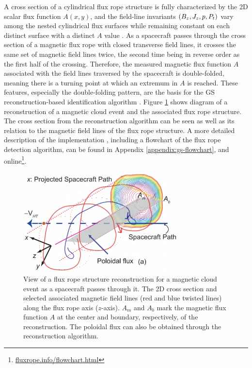 A cross section of a cylindrical flux rope structure is fully characterized by the 2D scalar flux function $A(x, y)$, and the field-line invariants $\left( B_z,J_z,p, P_t \right)$ vary among the nested cylindrical flux surfaces while remaining constant on each distinct surface with a distinct $A$ value \citep{Hu:2018}. As a spacecraft passes through the cross section of a magnetic flux rope with closed transverse field lines, it crosses the same set of magnetic field lines twice, the second time being in reverse order as the first half of the crossing. Therefore, the measured magnetic flux function $A$ associated with the field lines traversed by the spacecraft is double-folded, meaning there is a turning point at which an extremum in $A$ is reached. These features, especially the double-folding pattern, are the basis for the GS reconstruction-based identification algorithm \citep{Hu:2018}. Figure \ref{fig:GSreconstruction_Hu2017} shows diagram of a reconstruction of a magnetic cloud event and the associated flux rope structure. The cross section from the reconstruction algorithm can be seen as well as its relation to the magnetic field lines of the flux rope structure. A more detailed description of the implementation \citep{Hu:2018}, including a flowchart of the flux rope detection algorithm, can be found in Appendix \ref{appendix:gs-flowchart}, and online\footnote{\url{fluxrope.info/flowchart.html}}.

\begin{figure}
    \centering
    \includegraphics[width=0.75\textwidth]{Figures/Hu2017_5a.png}
    \caption[2D cross section view of a flux rope structure reconstruction] {View of a flux rope structure reconstruction for a magnetic cloud event \citep{Hu:2015} as a spacecraft passes through it. The 2D cross section and selected associated magnetic field lines (red and blue twisted lines) along the flux rope axis ($z$-axis). $A_m$ and $A_b$ mark the magnetic flux function $A$ at the center and boundary, respectively, of the reconstruction. The poloidal flux can also be obtained through the reconstruction algorithm.} %
    \label{fig:GSreconstruction_Hu2017}
\end{figure}

